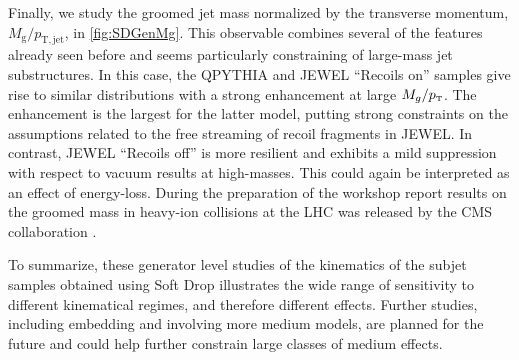 Finally, we study the groomed jet mass normalized by the transverse momentum, $M_{\mathrm{g}}/p_{\mathrm{T,jet}}$, in \autoref{fig:SDGenMg}. 
This observable combines several of the features already seen before and seems particularly constraining of large-mass jet substructures. In this case, the QPYTHIA and JEWEL ``Recoils on'' samples give rise to similar distributions with a strong enhancement at large $M_g/p_{\text{\tiny T}}$. The enhancement is the largest for the latter model, putting strong constraints on the assumptions related to the free streaming of recoil fragments in JEWEL. In contrast, JEWEL ``Recoils off'' is more resilient and exhibits a mild suppression with respect to vacuum results at high-masses. This could again be interpreted as an effect of energy-loss.
During the preparation of the workshop report results on the groomed mass in heavy-ion collisions at the LHC was released by the CMS collaboration \cite{Sirunyan:2018gct}. 

To summarize, these generator level studies of the kinematics of the subjet samples obtained using Soft Drop illustrates the wide range of sensitivity to different kinematical regimes, and therefore different effects. Further studies, including embedding and involving more medium models, are planned for the future and could help further constrain large classes of medium effects.

